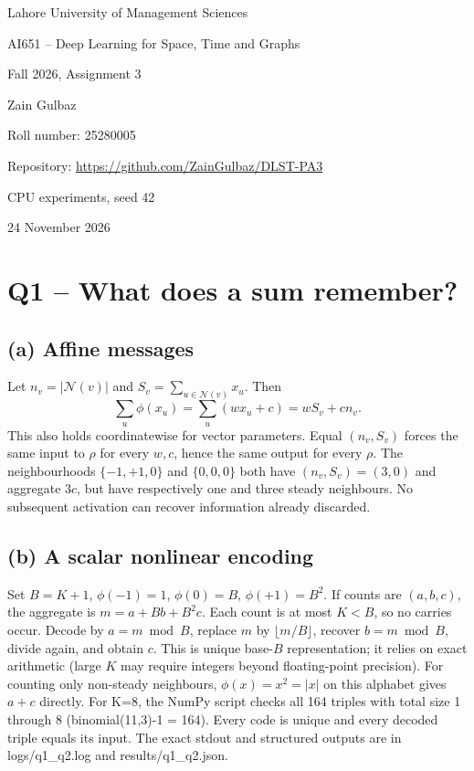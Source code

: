 \documentclass[11pt,a4paper]{article}
\begin{document}
\begin{titlepage}\centering
{\Large Lahore University of Management Sciences\par}\vspace{15mm}
{\huge AI651 -- Deep Learning for Space, Time and Graphs\par}\vspace{8mm}
{\Large Fall 2026, Assignment 3\par}\vspace{15mm}
{\LARGE Zain Gulbaz\par}\vspace{4mm}
{\Large Roll number: 25280005\par}\vspace{15mm}
{\large Repository: \url{https://github.com/ZainGulbaz/DLST-PA3}\par}\vspace{8mm}
{\large CPU experiments, seed 42\par}\vfill
{\large 24 November 2026\par}
\end{titlepage}
\tableofcontents\newpage
\section{Q1 -- What does a sum remember?}
\subsection{(a) Affine messages}
Let $n_v=|\mathcal N(v)|$ and $S_v=\sum_{u\in\mathcal N(v)}x_u$. Then
\[
\sum_u\phi(x_u)=\sum_u(wx_u+c)=wS_v+cn_v.
\]
This also holds coordinatewise for vector parameters. Equal $(n_v,S_v)$ forces the same input to $\rho$ for every $w,c$, hence the same output for every $\rho$. The neighbourhoods $\{-1,+1,0\}$ and $\{0,0,0\}$ both have $(n_v,S_v)=(3,0)$ and aggregate $3c$, but have respectively one and three steady neighbours. No subsequent activation can recover information already discarded.
\subsection{(b) A scalar nonlinear encoding}
Set $B=K+1$, $\phi(-1)=1$, $\phi(0)=B$, $\phi(+1)=B^2$. If counts are $(a,b,c)$, the aggregate is $m=a+Bb+B^2c$. Each count is at most $K<B$, so no carries occur. Decode by $a=m\bmod B$, replace $m$ by $\lfloor m/B\rfloor$, recover $b=m\bmod B$, divide again, and obtain $c$. This is unique base-$B$ representation; it relies on exact arithmetic (large $K$ may require integers beyond floating-point precision). For counting only non-steady neighbours, $\phi(x)=x^2=|x|$ on this alphabet gives $a+c$ directly.
For K=8, the NumPy script checks all 164 triples with total size 1 through 8 (binomial(11,3)-1 = 164). Every code is unique and every decoded triple equals its input. The exact stdout and structured outputs are in logs/q1\_q2.log and results/q1\_q2.json.
\end{document}
